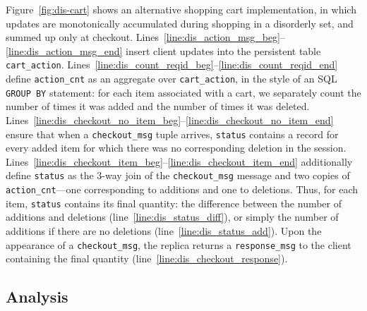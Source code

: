 Figure~\ref{fig:dis-cart} shows an alternative shopping cart
implementation, in which updates are monotonically accumulated during shopping
in a disorderly set, and summed up only at checkout.
Lines~\ref{line:dis_action_msg_beg}--\ref{line:dis_action_msg_end} insert client updates into the persistent
table \texttt{cart\_action}.  Lines~\ref{line:dis_count_reqid_beg}--\ref{line:dis_count_reqid_end} define
\texttt{action\_cnt} as an aggregate over \texttt{cart\_action}, in the style
of an SQL \texttt{GROUP BY} statement: for each item associated with a cart, we
separately count the number of times it was added and the number of times it
was deleted.
Lines~\ref{line:dis_checkout_no_item_beg}--\ref{line:dis_checkout_no_item_end}
ensure that when a \texttt{checkout\_msg} tuple arrives, \texttt{status}
contains a record for every added item for which there was no corresponding
deletion in the session.
Lines~\ref{line:dis_checkout_item_beg}--\ref{line:dis_checkout_item_end}
additionally define \texttt{status} as the 3-way join of the
\texttt{checkout\_msg} message and two copies of \texttt{action\_cnt}---one
corresponding to additions and one to deletions.  Thus, for each item,
\texttt{status} contains its final quantity: the difference between the number
of additions and deletions (line~\ref{line:dis_status_diff}), or simply the
number of additions if there are no deletions (line~\ref{line:dis_status_add}).
Upon the appearance of a \texttt{checkout\_msg}, the replica returns a
\texttt{response\_msg} to the client containing the final quantity
(line~\ref{line:dis_checkout_response}).


\subsection{Analysis}

